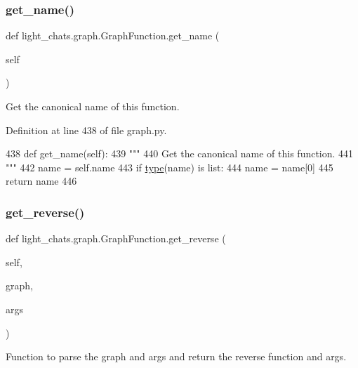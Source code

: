 \subsubsection{\texorpdfstring{get\+\_\+name()}{get\_name()}}
{\footnotesize\ttfamily def light\+\_\+chats.\+graph.\+Graph\+Function.\+get\+\_\+name (\begin{DoxyParamCaption}\item[{}]{self }\end{DoxyParamCaption})}

\begin{DoxyVerb}Get the canonical name of this function.
\end{DoxyVerb}
 

Definition at line 438 of file graph.\+py.


\begin{DoxyCode}
438     \textcolor{keyword}{def }get\_name(self):
439         \textcolor{stringliteral}{"""}
440 \textcolor{stringliteral}{        Get the canonical name of this function.}
441 \textcolor{stringliteral}{        """}
442         name = self.name
443         \textcolor{keywordflow}{if} \hyperlink{namespaceparlai_1_1agents_1_1tfidf__retriever_1_1build__tfidf_ad5dfae268e23f506da084a9efb72f619}{type}(name) \textcolor{keywordflow}{is} list:
444             name = name[0]
445         \textcolor{keywordflow}{return} name
446 
\end{DoxyCode}
\mbox{\label{classlight__chats_1_1graph_1_1GraphFunction_aa7929e44e5afafd4d27418c7fe5a2fe0}} 
\subsubsection{\texorpdfstring{get\+\_\+reverse()}{get\_reverse()}}
{\footnotesize\ttfamily def light\+\_\+chats.\+graph.\+Graph\+Function.\+get\+\_\+reverse (\begin{DoxyParamCaption}\item[{}]{self,  }\item[{}]{graph,  }\item[{}]{args }\end{DoxyParamCaption})}

\begin{DoxyVerb}Function to parse the graph and args and return the reverse function and args.
\end{DoxyVerb}
 

